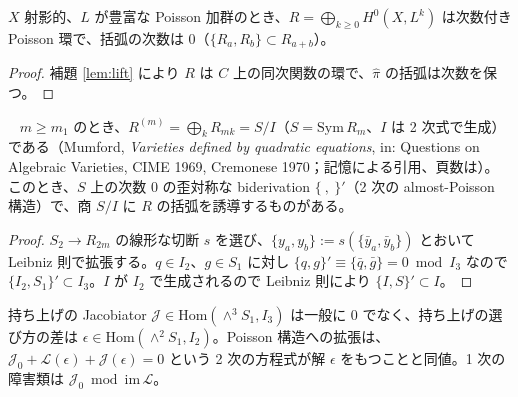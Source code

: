 \begin{prop}\tP\label{prop:graded}
$X$ 射影的、$L$ が豊富な Poisson 加群のとき、$R=\bigoplus_{k\ge0}H^0(X,L^k)$ は次数付き Poisson 環で、括弧の次数は 0（$\{R_a,R_b\}\subset R_{a+b}$）。
\end{prop}
\begin{proof}
補題 \ref{lem:lift} により $R$ は $C$ 上の同次関数の環で、$\hat\pi$ の括弧は次数を保つ。\qedhere
\end{proof}
\begin{prop}\tP\ \tC\label{prop:almost}
$m\ge m_1$ のとき、$R^{(m)}=\bigoplus_kR_{mk}=S/I$（$S=\mathrm{Sym}\,R_m$、$I$ は 2 次式で生成）である（Mumford, \emph{Varieties defined by quadratic equations}, in: Questions on Algebraic Varieties, CIME 1969, Cremonese 1970；記憶による引用、頁数は\tQ）。このとき、$S$ 上の次数 0 の歪対称な biderivation $\{\ ,\ \}'$（2 次の almost-Poisson 構造）で、商 $S/I$ に $R$ の括弧を誘導するものがある。
\end{prop}
\begin{proof}
$S_2\to R_{2m}$ の線形な切断 $s$ を選び、$\{y_a,y_b\}:=s(\{\bar y_a,\bar y_b\})$ とおいて Leibniz 則で拡張する。$q\in I_2$、$g\in S_1$ に対し $\{q,g\}'\equiv\{\bar q,\bar g\}=0\bmod I_3$ なので $\{I_2,S_1\}'\subset I_3$。$I$ が $I_2$ で生成されるので Leibniz 則により $\{I,S\}'\subset I$。\qedhere
\end{proof}
\noindent 持ち上げの Jacobiator $\mathcal J\in\mathrm{Hom}(\wedge^3S_1,I_3)$ は一般に 0 でなく、持ち上げの選び方の差は $\epsilon\in\mathrm{Hom}(\wedge^2S_1,I_2)$。Poisson 構造への拡張は、$\mathcal J_0+\mathcal L(\epsilon)+\mathcal J(\epsilon)=0$ という 2 次の方程式が解 $\epsilon$ をもつことと同値。1 次の障害類は $\mathcal J_0\bmod\mathrm{im}\,\mathcal L$。

